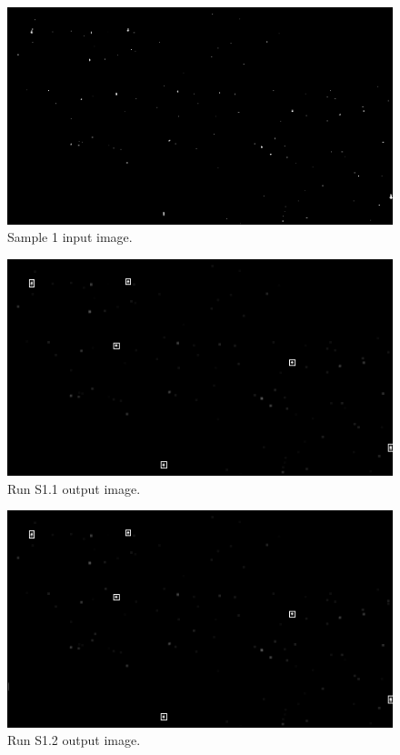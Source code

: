\documentclass[12pt]{report}
\begin{document}
\begin{figure}[!h]
    \centering
    \includegraphics[scale=0.7]{results/s0_in.png}
    \caption{Sample 1 input image.}
    \label{res:s0_in}
\end{figure}
\begin{figure}[!h]
    \centering
    \includegraphics[scale=1.2]{results/s0_1.png}
    \caption{Run S1.1 output image.}
    \label{res:s0_1}
\end{figure}
\begin{figure}[!h]
    \centering
    \includegraphics[scale=1.2]{results/s0_2.png}
    \caption{Run S1.2 output image.}
    \label{res:s0_2}
\end{figure}
\end{document}

